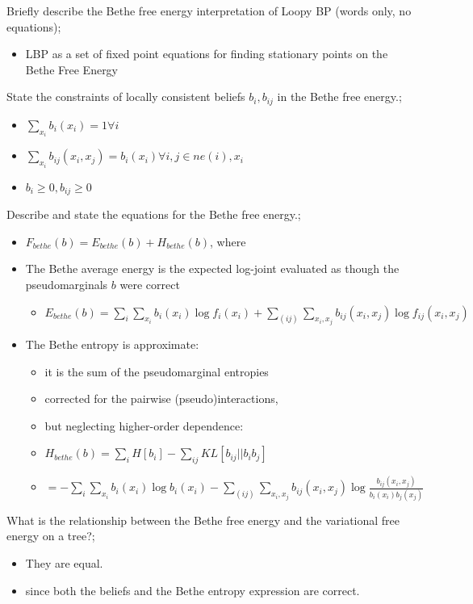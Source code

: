 \documentclass{article}
\begin{document}

Briefly describe the Bethe free energy interpretation of Loopy BP (words only, no equations); \begin{itemize} \item LBP as a set of fixed point equations for finding stationary points on the Bethe Free Energy \end{itemize}

State the constraints of locally consistent beliefs $b_i, b_{ij}$ in the Bethe free energy.; \begin{itemize} \item $\sum_{x_i} b_i(x_i) = 1 \forall i$ \item $\sum_{x_i}b_{ij}(x_i, x_j) = b_i(x_i) \forall i, j \in ne(i), x_i$ \item $b_i \geq 0, b_{ij} \geq 0$ \end{itemize}

Describe and state the equations for the Bethe free energy.; \begin{itemize} \item $F_{bethe}(b) = E_{bethe}(b) + H_{bethe}(b)$, where \item The Bethe average energy is the expected log-joint evaluated as though the pseudomarginals $b$ were correct \begin{itemize} \item $E_{bethe}(b) = \sum_i \sum_{x_i} b_i(x_i)\log f_i(x_i) + \sum_{(ij)}\sum_{x_i, x_j} b_{ij}(x_i, x_j)\log f_{ij}(x_i, x_j)$ \end{itemize}  \item The Bethe entropy is approximate: \begin{itemize} \item it is the sum of the pseudomarginal entropies \item corrected for the pairwise (pseudo)interactions, \item but neglecting higher-order dependence: \item $H_{bethe}(b) = \sum_i H[b_i] - \sum_{ij}KL[b_{ij}||b_ib_j]$ \item $=-\sum_i \sum_{x_i}b_i(x_i)\log b_i(x_i) - \sum_{(ij)}\sum_{x_i, x_j}b_{ij}(x_i, x_j)\log \frac{b_{ij}(x_i, x_j)}{b_i(x_i)b_j(x_j)}$ \end{itemize}  \end{itemize}

What is the relationship between the Bethe free energy and the variational free energy on a tree?; \begin{itemize} \item They are equal. \item since both the beliefs and the Bethe entropy expression are correct. \end{itemize}
\end{document}
